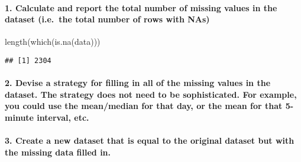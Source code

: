 \documentclass[
]{article}
\newenvironment{Shaded}{\begin{snugshade}}{\end{snugshade}}
\newcommand{\FunctionTok}[1]{\textcolor[rgb]{0.00,0.00,0.00}{#1}}
\newcommand{\NormalTok}[1]{#1}
\newcommand{\OtherTok}[1]{\textcolor[rgb]{0.56,0.35,0.01}{#1}}
\newcommand{\SpecialCharTok}[1]{\textcolor[rgb]{0.00,0.00,0.00}{#1}}
\begin{document}
\hypertarget{calculate-and-report-the-total-number-of-missing-values-in-the-dataset-i.e.-the-total-number-of-rows-with-nas}{%
\paragraph{1. Calculate and report the total number of missing values in
the dataset (i.e.~the total number of rows with
NAs)}\label{calculate-and-report-the-total-number-of-missing-values-in-the-dataset-i.e.-the-total-number-of-rows-with-nas}}

\begin{Shaded}
\begin{Highlighting}[]
\FunctionTok{length}\NormalTok{(}\FunctionTok{which}\NormalTok{(}\FunctionTok{is.na}\NormalTok{(data)))}
\end{Highlighting}
\end{Shaded}

\begin{verbatim}
## [1] 2304
\end{verbatim}

\hypertarget{devise-a-strategy-for-filling-in-all-of-the-missing-values-in-the-dataset.-the-strategy-does-not-need-to-be-sophisticated.-for-example-you-could-use-the-meanmedian-for-that-day-or-the-mean-for-that-5-minute-interval-etc.}{%
\paragraph{2. Devise a strategy for filling in all of the missing values
in the dataset. The strategy does not need to be sophisticated. For
example, you could use the mean/median for that day, or the mean for
that 5-minute interval,
etc.}\label{devise-a-strategy-for-filling-in-all-of-the-missing-values-in-the-dataset.-the-strategy-does-not-need-to-be-sophisticated.-for-example-you-could-use-the-meanmedian-for-that-day-or-the-mean-for-that-5-minute-interval-etc.}}

\begin{Shaded}
\end{Shaded}

\hypertarget{create-a-new-dataset-that-is-equal-to-the-original-dataset-but-with-the-missing-data-filled-in.}{%
\paragraph{3. Create a new dataset that is equal to the original dataset
but with the missing data filled
in.}\label{create-a-new-dataset-that-is-equal-to-the-original-dataset-but-with-the-missing-data-filled-in.}}
\end{document}

